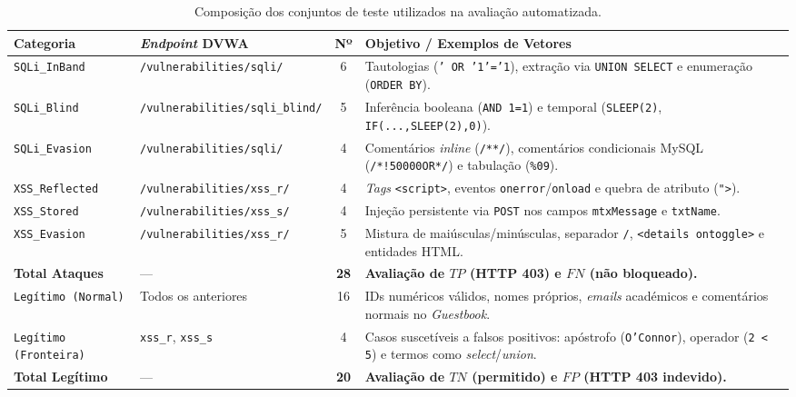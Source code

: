 \documentclass[11pt,a4paper]{article}
\begin{document}
\begin{table}[htbp]
\centering
\small
\setlength{\tabcolsep}{5pt}
\renewcommand{\arraystretch}{1.15}
\caption{Composição dos conjuntos de teste utilizados na avaliação automatizada.}
\label{tab:composicao_datasets}
\begin{tabularx}{\textwidth}{l >{\raggedright\arraybackslash}p{3.0cm} c >{\raggedright\arraybackslash}X}
\toprule
\textbf{Categoria} & \textbf{\textit{Endpoint} DVWA} & \textbf{Nº} & \textbf{Objetivo / Exemplos de Vetores} \\
\midrule
\texttt{SQLi\_InBand} & \texttt{/vulnerabilities/\allowbreak sqli/} & 6 & Tautologias (\texttt{' OR '1'='1}), extração via \texttt{UNION SELECT} e enumeração (\texttt{ORDER BY}). \\
\texttt{SQLi\_Blind} & \texttt{/vulnerabilities/\allowbreak sqli\_blind/} & 5 & Inferência booleana (\texttt{AND 1=1}) e temporal (\texttt{SLEEP(2)}, \texttt{IF(...,SLEEP(2),0)}). \\
\texttt{SQLi\_Evasion} & \texttt{/vulnerabilities/\allowbreak sqli/} & 4 & Comentários \textit{inline} (\texttt{/**/}), comentários condicionais MySQL (\texttt{/*!50000OR*/}) e tabulação (\texttt{\%09}). \\
\texttt{XSS\_Reflected} & \texttt{/vulnerabilities/\allowbreak xss\_r/} & 4 & \textit{Tags} \texttt{<script>}, eventos \texttt{onerror}/\texttt{onload} e quebra de atributo (\texttt{"{}>}). \\
\texttt{XSS\_Stored} & \texttt{/vulnerabilities/\allowbreak xss\_s/} & 4 & Injeção persistente via \texttt{POST} nos campos \texttt{mtxMessage} e \texttt{txtName}. \\
\texttt{XSS\_Evasion} & \texttt{/vulnerabilities/\allowbreak xss\_r/} & 5 & Mistura de maiúsculas/minúsculas, separador \texttt{/}, \texttt{<details ontoggle>} e entidades HTML. \\
\midrule
\textbf{Total Ataques} & --- & \textbf{28} & \textbf{Avaliação de $TP$ (HTTP 403) e $FN$ (não bloqueado).} \\
\midrule
\texttt{Legítimo (Normal)} & Todos os anteriores & 16 & IDs numéricos válidos, nomes próprios, \textit{emails} académicos e comentários normais no \textit{Guestbook}. \\
\texttt{Legítimo (Fronteira)} & \texttt{xss\_r}, \texttt{xss\_s} & 4 & Casos suscetíveis a falsos positivos: apóstrofo (\texttt{O'Connor}), operador (\texttt{2 < 5}) e termos como \textit{select}/\textit{union}. \\
\midrule
\textbf{Total Legítimo} & --- & \textbf{20} & \textbf{Avaliação de $TN$ (permitido) e $FP$ (HTTP 403 indevido).} \\
\bottomrule
\end{tabularx}
\end{table}
\end{document}
